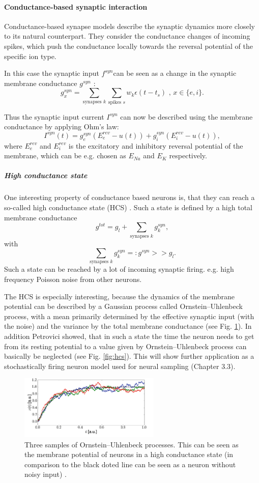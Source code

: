 \paragraph{Conductance-based synaptic interaction} 
Conductance-based synapse models describe the synaptic dynamics more closely to its natural counterpart. They consider the conductance changes of incoming spikes, which push the conductance locally towards the reversal potential of the specific ion type. 

In this case the synaptic input $f^{syn} $can be seen as a change in the synaptic membrane conductance $g^{syn}$ :
\[
g_x^{syn} = \sum_{\text{synapses } k } \sum_{\text{spikes } s} w_k \epsilon(t - t_s) \text{ ,      } x \in \{e, i\}.
\]

Thus the synaptic input current $I^{syn}$ can now be described using the membrane conductance by applying Ohm's law:
\[
I^{syn}(t) = g_e^{syn} (E_e^{rev} - u(t)) + g_i^{syn} (E_i^{rev} - u(t)),
\]
where $E_e^{rev}$ and $E_i^{rev}$ is the excitatory and inhibitory reversal potential of the membrane, which can be e.g. chosen as $E_{Na}$ and $E_{K}$ respectively.  

\subparagraph{High conductance state} One interesting property of conductance based neurons is, that they can reach a so-called high conductance state (HCS) \cite{Petrovici2016}. Such a state is defined by a high total membrane conductance 
\[
g^{tot} = g_l + \sum_{\text{synapses } k} g_k^{syn},
\]
with 
\[
\sum_{\text{synapses } k} g_k^{syn} =: g^{syn} >> g_l .
\]
Such a state can be reached by a lot of incoming synaptic firing. e.g. high frequency Poisson noise from other neurons. 

The HCS is especially interesting, because the dynamics of the membrane potential can be described by a Gaussian process called Ornstein–Uhlenbeck process, with a mean primarily determined by the effective synaptic input (with the noise) and the variance by the total membrane conductance (see Fig. \ref{fig:ornuhl}).
In addition Petrovici showed, that in such a state the time the neuron needs to get from its resting potential to a value given by Ornstein–Uhlenbeck process can basically be neglected (see Fig. \ref{fig:hcs}).
This will show further application as a stochastically firing neuron model used for neural sampling (Chapter 3.3).

\begin{figure}
	\centering
    	\includegraphics[width=0.6\textwidth]{imgs/orn_uhl_process.png} 
    \caption{Three samples of Ornstein–Uhlenbeck processes. This can be seen as the membrane potential of neurons in a high conductance state (in comparison to the black doted line can be seen as a neuron without noisy input) \cite{Petrovici2016}.}
	\label{fig:ornuhl}
\end{figure}


